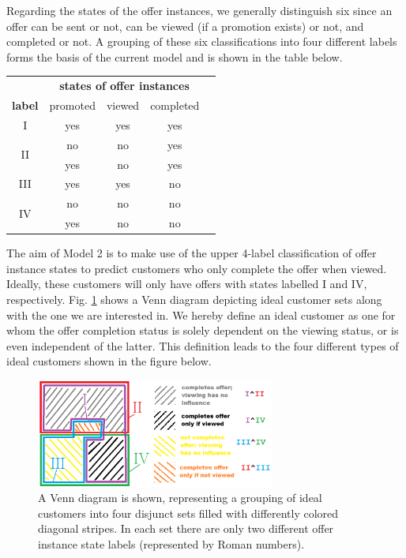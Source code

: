 \documentclass[11pt]{article} %
\begin{document}
Regarding the states of the offer instances, we generally distinguish six since an offer can be  sent or not, can be viewed (if a promotion exists) or not, and completed or not.
A grouping of these six classifications into four different labels forms the basis of the current model and is shown in the table below.

\begin{center}
{\Large
\begin{tabular}{|c||c|c|c|c|}
 \hline
&\multicolumn{3}{c|}{  \textbf{states of offer instances}}\\
 \textbf{label} & promoted & viewed & completed \\ 
\hline
\hline
I & yes & yes & yes \\ 
\hline
\multirow{ 2}{*}{II} & no & no & yes \\ 
 & yes & no & yes \\ 
\hline
III & yes & yes & no \\ 
\hline
\multirow{ 2}{*}{IV} &no & no & no \\ 
 & yes & no & no \\ 
 \hline
\end{tabular}
}
\end{center}

The aim of Model 2 is to make use of the upper 4-label classification of offer instance states to predict customers who only complete the offer when viewed.
Ideally, these customers will only have offers with states labelled I and IV, respectively. Fig. \ref{fig:venn2} shows a Venn diagram depicting ideal customer sets along with the one we are interested in. We hereby define an ideal customer as one for whom the offer completion status is solely dependent on the viewing status, or is even independent of the latter.
This definition leads to the four different types of ideal customers shown in the figure below.
\begin{figure}[H]
\begin{center}
\includegraphics[width=0.7\textwidth]{pics/venn_diagram2.png}
\caption{\label{fig:venn2}A Venn diagram is shown, representing a grouping of ideal customers into four disjunct sets filled with differently colored diagonal stripes. In each set there are only two different offer instance state labels (represented by Roman numbers). 
}
\end{center}
\end{figure}
\end{document}
